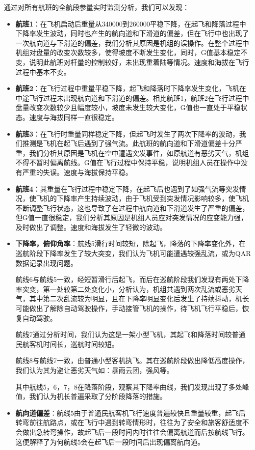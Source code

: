 \documentclass{MathorCupModeling}
\begin{document}
	通过对所有航班的全航段参量实时监测分析，我们可以发现：
	\begin{itemize}
		\item \textbf{航班1}：在飞机启动后重量从340000到260000平稳下降，在起飞和降落过程中下降率发生波动，同时也产生的航向道和下滑道的偏差，但在飞行中也出现了一次航向道与下滑道的偏差，我们分析其原因是机组的误操作。在整个过程中机组对盘量的改变次数较多，使得坡度不断发生变化，同时，G值基本稳定不变，说明此航班对杆量的控制较好，未出现重着陆等情况。速度和海拔在飞行过程中基本不变。
		\item \textbf{航班2}：在飞行过程中重量平稳下降，起飞和降落时下降率发生变化，飞机在中途飞行过程未出现航向道和下滑道的偏差。相比航班1，航班2在飞行过程中盘量改变次数较少且幅度较小，坡度未发生较大变化，G值也一直处于平稳状态。速度与海拔同样一直很稳定。
		\item \textbf{航班3}：在飞行时重量同样稳定下降，但起飞时发生了两次下降率的波动，我们推测是飞机在起飞后遇到了强气流。此航班的航向道和下滑道偏差十分严重，我们分析其原因是飞机在空中遭遇突发事件，如原航道有恶劣天气，机组不得不暂时偏离航线。G值在飞行过程中保持平稳，说明机组人员在操作中没有严重的失误。速度与海拔保持平稳。
		\item \textbf{航班4}：其重量在飞行过程中稳定下降，在起飞后也遇到了如强气流等突发情况，使飞机的下降率产生持续波动，由于飞机受到突发情况影响较多，使飞机不断调整飞行状态，这也导致了在过程中航向道和下滑道发生了严重的偏差，但G值一直很稳定，我们分析其原因是机组人员应对突发情况的应变能力强，及时做出了调整。速度和海拔发生了轻微的波动。
		\item \textbf{下降率，俯仰角率}：航线5滑行时间较短，除起飞，降落的下降率变化外，在巡航阶段下降率发生了较大突变，我们认为飞机可能遭遇较强乱流，或为QAR数据记录出现问题。
		
		航线6与航线5一致，经短暂滑行后起飞，而后在巡航阶段我们发现有两处下降率突变，第一处较第二处变化小，分析认为，机组共遇到两次乱流或恶劣天气，其中第二次乱流较为明显，且在下降率明显变化后发生了持续抖动，机长可能做出了解除自动驾驶操作，手动接管飞机的操作，待飞机飞行平稳后，恢复自动驾驶。

		航线7通过分析时间，我们认为这是一架小型飞机，其起飞和降落时间较普通民航客机时间长，巡航时间较短。
		
		航线8与航线7一致，由普通小型客机执飞。其在巡航阶段做出降低高度操作，我们认为其为避让恶劣天气如：暴雨云团，强风等。
		
		其中航线5，6，7，8在降落阶段，观察其下降率曲线，我们发现出现了多处峰值，我们认为机长普遍采取了分阶段降落的措施。
		\item \textbf{航向道偏差}：航线5由于普通民航客机飞行速度普遍较快且重量较重，起飞后转弯前往航路点，或在飞行中遇到转弯情形时，往往为了安全和旅客舒适度不会做出急转弯操作，故起飞后一段时间内时往往会偏离航道而后按航线飞行。这便解释了为何航线5会在起飞后一段时间后出现偏离航向道。
		

\end{itemize}
\end{document}
